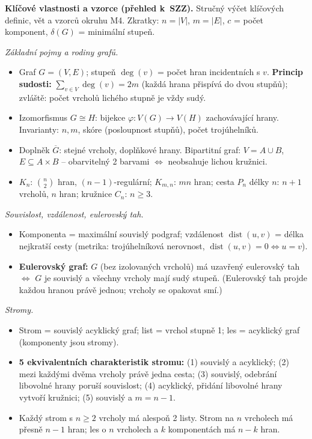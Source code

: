 \documentclass[11pt,a4paper]{article}
\DeclareMathOperator{\dist}{dist}
\begin{document}
\begin{poznamka}
\textbf{Klíčové vlastnosti a vzorce (přehled k~SZZ).} Stručný výčet klíčových definic, vět a vzorců okruhu M4. Zkratky: $n=|V|$, $m=|E|$, $c$ = počet komponent, $\delta(G)$ = minimální stupeň.

\smallskip
\emph{Základní pojmy a rodiny grafů.}
\begin{itemize}
  \item Graf $G=(V,E)$; stupeň $\deg(v)$ = počet hran incidentních s $v$. \textbf{Princip sudosti:} $\sum_{v\in V}\deg(v)=2m$ (každá hrana přispívá do dvou stupňů); zvláště: počet vrcholů lichého stupně je vždy sudý.
  \item Izomorfismus $G\cong H$: bijekce $\varphi\colon V(G)\to V(H)$ zachovávající hrany. Invarianty: $n,m$, skóre (posloupnost stupňů), počet trojúhelníků.
  \item Doplněk $\overline{G}$: stejné vrcholy, doplňkové hrany. Bipartitní graf: $V=A\cup B$, $E\subseteq A\times B$ -- obarvitelný 2 barvami $\iff$ neobsahuje lichou kružnici.
  \item $K_n$: $\binom{n}{2}$ hran, $(n-1)$-regulární; $K_{m,n}$: $mn$ hran; cesta $P_n$ délky $n$: $n+1$ vrcholů, $n$ hran; kružnice $C_n$: $n\ge 3$.
\end{itemize}

\smallskip
\emph{Souvislost, vzdálenost, eulerovský tah.}
\begin{itemize}
  \item Komponenta = maximální souvislý podgraf; vzdálenost $\dist(u,v)$ = délka nejkratší cesty (metrika: trojúhelníková nerovnost, $\dist(u,v)=0\iff u=v$).
  \item \textbf{Eulerovský graf:} $G$ (bez izolovaných vrcholů) má uzavřený eulerovský tah $\iff$ $G$ je souvislý a všechny vrcholy mají sudý stupeň. (Eulerovský tah projde každou hranou právě jednou; vrcholy se opakovat smí.)
\end{itemize}

\smallskip
\emph{Stromy.}
\begin{itemize}
  \item Strom = souvislý acyklický graf; list = vrchol stupně 1; les = acyklický graf (komponenty jsou stromy).
  \item \textbf{5 ekvivalentních charakteristik stromu:} (1) souvislý a acyklický; (2) mezi každými dvěma vrcholy právě jedna cesta; (3) souvislý, odebrání libovolné hrany poruší souvislost; (4) acyklický, přidání libovolné hrany vytvoří kružnici; (5) souvislý a $m=n-1$.
  \item Každý strom s $n\ge 2$ vrcholy má alespoň 2 listy. Strom na $n$ vrcholech má přesně $n-1$ hran; les o $n$ vrcholech a $k$ komponentách má $n-k$ hran.
\end{itemize}


\end{poznamka}
\end{document}
